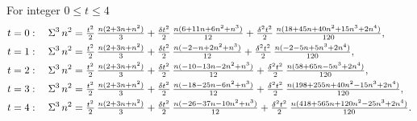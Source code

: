 \begin{example}
  For integer $0 \leq t \leq 4$
  \begin{align*}
    t=0:\quad
    \Sigma^{3}\,{n}^{2}
    &=
    \tfrac{t^2}{2}\,\tfrac{n(2+3n+n^2)}{3}
    +
    \tfrac{\delta t^2}{2}\,\tfrac{n(6+11n+6n^2+n^3)}{12}
    +
    \tfrac{\delta^2 t^2}{2}\,\tfrac{n(18+45n+40n^2+15n^3+2n^4)}{120},
    \\
    t=1:\quad
    \Sigma^{3}\,{n}^{2}
    &=
    \tfrac{t^2}{2}\,\tfrac{n(2+3n+n^2)}{3}
    +
    \tfrac{\delta t^2}{2}\,\tfrac{n(-2-n+2n^2+n^3)}{12}
    +
    \tfrac{\delta^2 t^2}{2}\,\tfrac{n(-2-5n+5n^3+2n^4)}{120},
    \\
    t=2:\quad
    \Sigma^{3}\,{n}^{2}
    &=
    \tfrac{t^2}{2}\,\tfrac{n(2+3n+n^2)}{3}
    +
    \tfrac{\delta t^2}{2}\,\tfrac{n(-10-13n-2n^2+n^3)}{12}
    +
    \tfrac{\delta^2 t^2}{2}\,\tfrac{n(58+65n-5n^3+2n^4)}{120},
    \\
    t=3:\quad
    \Sigma^{3}\,{n}^{2}
    &=
    \tfrac{t^2}{2}\,\tfrac{n(2+3n+n^2)}{3}
    +
    \tfrac{\delta t^2}{2}\,\tfrac{n(-18-25n-6n^2+n^3)}{12}
    +
    \tfrac{\delta^2 t^2}{2}\,\tfrac{n(198+255n+40n^2-15n^3+2n^4)}{120},
    \\
    t=4:\quad
    \Sigma^{3}\,{n}^{2}
    &=
    \tfrac{t^2}{2}\,\tfrac{n(2+3n+n^2)}{3}
    +
    \tfrac{\delta t^2}{2}\,\tfrac{n(-26-37n-10n^2+n^3)}{12}
    +
    \tfrac{\delta^2 t^2}{2}\,\tfrac{n(418+565n+120n^2-25n^3+2n^4)}{120}.
  \end{align*}
\end{example}
